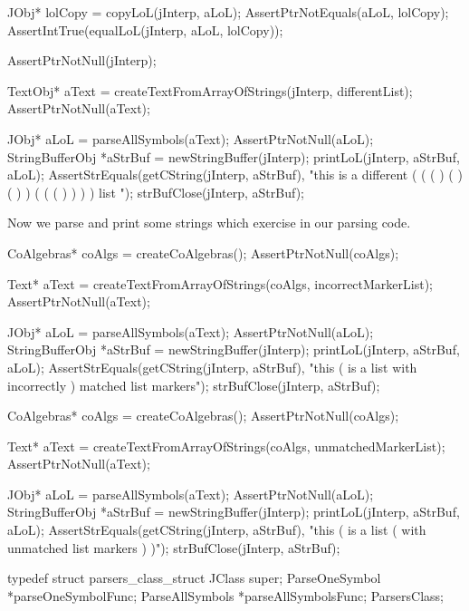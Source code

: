   JObj* lolCopy = copyLoL(jInterp, aLoL);
  AssertPtrNotEquals(aLoL, lolCopy);
  AssertIntTrue(equalLoL(jInterp, aLoL, lolCopy));
\stopCTest
\stopTestCase

\startCTest
  AssertPtrNotNull(jInterp);

  TextObj* aText =
    createTextFromArrayOfStrings(jInterp, differentList);
  AssertPtrNotNull(aText);

  JObj* aLoL = parseAllSymbols(aText);
  AssertPtrNotNull(aLoL);
  StringBufferObj *aStrBuf = newStringBuffer(jInterp);
  printLoL(jInterp, aStrBuf, aLoL);
  AssertStrEquals(getCString(jInterp, aStrBuf),
    "this is a different ( ( ( ) ( ) ( ) ) ( ( ( ) ) ) ) list ");
  strBufClose(jInterp, aStrBuf);
\stopCTest
\stopTestCase

Now we parse and print some strings which exercise  
in our parsing code. 

\startCTest
  CoAlgebras* coAlgs = createCoAlgebras();
  AssertPtrNotNull(coAlgs);

  Text* aText = createTextFromArrayOfStrings(coAlgs, incorrectMarkerList);
  AssertPtrNotNull(aText);

  JObj* aLoL = parseAllSymbols(aText);
  AssertPtrNotNull(aLoL);
  StringBufferObj *aStrBuf = newStringBuffer(jInterp);
  printLoL(jInterp, aStrBuf, aLoL);
  AssertStrEquals(getCString(jInterp, aStrBuf),
    "this ( is a list with incorrectly ) matched list markers");
  strBufClose(jInterp, aStrBuf);
\stopCTest
\ignoreTestCase

\startCTest
  CoAlgebras* coAlgs = createCoAlgebras();
  AssertPtrNotNull(coAlgs);

  Text* aText = createTextFromArrayOfStrings(coAlgs, unmatchedMarkerList);
  AssertPtrNotNull(aText);

  JObj* aLoL = parseAllSymbols(aText);
  AssertPtrNotNull(aLoL);
  StringBufferObj *aStrBuf = newStringBuffer(jInterp);
  printLoL(jInterp, aStrBuf, aLoL);
  AssertStrEquals(getCString(jInterp, aStrBuf),
    "this ( is a list ( with unmatched list markers ) )");
  strBufClose(jInterp, aStrBuf);
\stopCTest
\ignoreTestCase
\stopTestSuite

\startTestSuite[registerParsers]

\startCHeader
typedef struct parsers_class_struct {
  JClass       super;
  ParseOneSymbol  *parseOneSymbolFunc;
  ParseAllSymbols *parseAllSymbolsFunc;
} ParsersClass;
\stopCHeader

